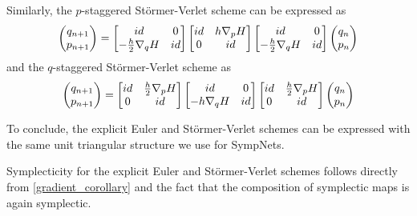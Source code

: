 \documentclass[twoside,a4paper]{article}
\begin{document}
Similarly, the $p$-staggered Störmer-Verlet scheme can be expressed as
\begin{equation*}
	\begin{pmatrix}
		q_{n+1} \\
		p_{n+1}
	\end{pmatrix} =
	\begin{bmatrix}
		id & 0 \\
		-\frac{h}{2} \grad[q]{H} & id
	\end{bmatrix}
	\begin{bmatrix}
		id & h \grad[p]{H} \\
		0 & id
	\end{bmatrix}
	\begin{bmatrix}
		id & 0 \\
		-\frac{h}{2} \grad[q]{H} & id
	\end{bmatrix}
	\begin{pmatrix}
		q_{n} \\
		p_{n}
	\end{pmatrix}
\end{equation*}
and the $q$-staggered Störmer-Verlet scheme as
\begin{equation*}
	\begin{pmatrix}
		q_{n+1} \\
		p_{n+1}
	\end{pmatrix} =
	\begin{bmatrix}
		id & \frac{h}{2} \grad[p]{H} \\
		0 & id
	\end{bmatrix}
	\begin{bmatrix}
		id & 0 \\
		-h \grad[q]{H} & id
	\end{bmatrix}
	\begin{bmatrix}
		id & \frac{h}{2} \grad[p]{H} \\
		0 & id
	\end{bmatrix}
	\begin{pmatrix}
		q_{n} \\
		p_{n}
	\end{pmatrix}
\end{equation*}

To conclude, the explicit Euler and Störmer-Verlet schemes can be expressed with
the same unit triangular structure we use for SympNets. 

Symplecticity for the explicit Euler and Störmer-Verlet schemes follows directly 
from \cref{gradient_corollary} and the fact that the composition of symplectic maps is again symplectic.
\end{document}
